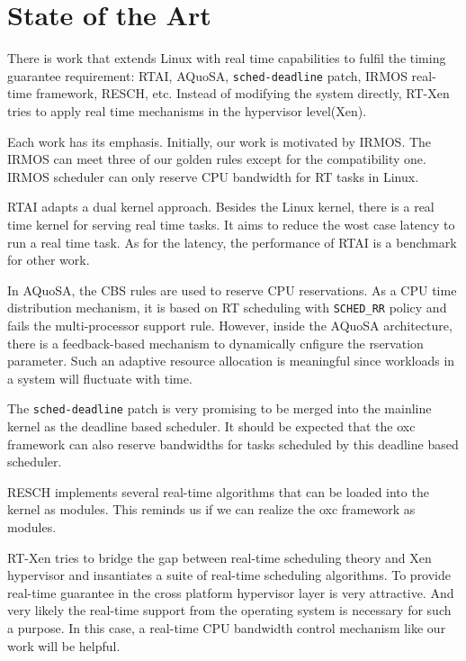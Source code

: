 \section{State of the Art}

There is work that extends Linux with real time capabilities to fulfil 
the timing guarantee requirement: RTAI\cite{rtai}, AQuoSA\cite{Luigi09}, 
\texttt{sched-deadline} patch\cite{Dario09}, 
IRMOS real-time framework\cite{irmos}, RESCH\cite{resch}, etc.
%
Instead of modifying the system directly, RT-Xen\cite{rtxen} tries to 
apply real time mechanisms in the hypervisor level(Xen). 

Each work has its emphasis. Initially, our work is motivated by
IRMOS. The IRMOS can meet three of our golden rules except for 
the compatibility one. IRMOS scheduler can only reserve CPU 
bandwidth for RT tasks in Linux.  

RTAI adapts a dual kernel approach. Besides the Linux kernel, there is
a real time kernel for serving real time tasks. It aims to reduce the
wost case latency to run a real time task. As for the latency, the 
performance of RTAI is a benchmark for other work. 

In AQuoSA, the CBS rules are used to reserve CPU reservations. 
As a CPU time distribution mechanism, it is based on RT scheduling 
with \texttt{SCHED\_RR} policy and fails the multi-processor support 
rule. However, inside the AQuoSA architecture, there is a feedback-based 
mechanism to dynamically cnfigure the rservation parameter. Such an 
adaptive resource allocation is meaningful since workloads in a system 
will fluctuate with time. 

The \texttt{sched-deadline} patch is very promising to be merged 
into the mainline kernel as the deadline based scheduler. 
It should be expected that the oxc framework can also reserve 
bandwidths for tasks scheduled by this deadline based scheduler. 

RESCH implements several real-time algorithms that can be
loaded into the kernel as modules. This reminds us if we can realize 
the oxc framework as modules. 

RT-Xen tries to bridge the gap between real-time scheduling theory and 
Xen hypervisor and insantiates a suite of real-time scheduling algorithms. 
To provide real-time guarantee in the cross platform hypervisor layer is 
very attractive. And very likely the real-time support from the operating 
system is necessary for such a purpose. In this case, a real-time CPU 
bandwidth control mechanism like our work will be helpful.

